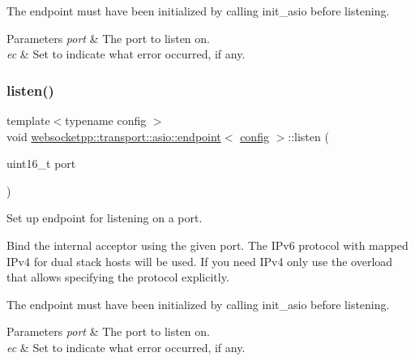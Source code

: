 The endpoint must have been initialized by calling init\+\_\+asio before listening.


\begin{DoxyParams}{Parameters}
{\em port} & The port to listen on. \\
\hline
{\em ec} & Set to indicate what error occurred, if any. \\
\hline
\end{DoxyParams}
\mbox{\label{classwebsocketpp_1_1transport_1_1asio_1_1endpoint_a80c1e2bb6edbfbfc46d387015e528117}} 
\subsubsection{\texorpdfstring{listen()}{listen()}\hspace{0.1cm}{\footnotesize\ttfamily [6/8]}}
{\footnotesize\ttfamily template$<$typename config $>$ \\
void \mbox{\hyperlink{classwebsocketpp_1_1transport_1_1asio_1_1endpoint}{websocketpp\+::transport\+::asio\+::endpoint}}$<$ \mbox{\hyperlink{classconfig}{config}} $>$\+::listen (\begin{DoxyParamCaption}\item[{uint16\+\_\+t}]{port }\end{DoxyParamCaption})\hspace{0.3cm}{\ttfamily [inline]}}



Set up endpoint for listening on a port. 

Bind the internal acceptor using the given port. The I\+Pv6 protocol with mapped I\+Pv4 for dual stack hosts will be used. If you need I\+Pv4 only use the overload that allows specifying the protocol explicitly.

The endpoint must have been initialized by calling init\+\_\+asio before listening.


\begin{DoxyParams}{Parameters}
{\em port} & The port to listen on. \\
\hline
{\em ec} & Set to indicate what error occurred, if any. \\
\hline
\end{DoxyParams}
\mbox{\label{classwebsocketpp_1_1transport_1_1asio_1_1endpoint_a85606665cc9c948194076c2377cb61c0}} 
